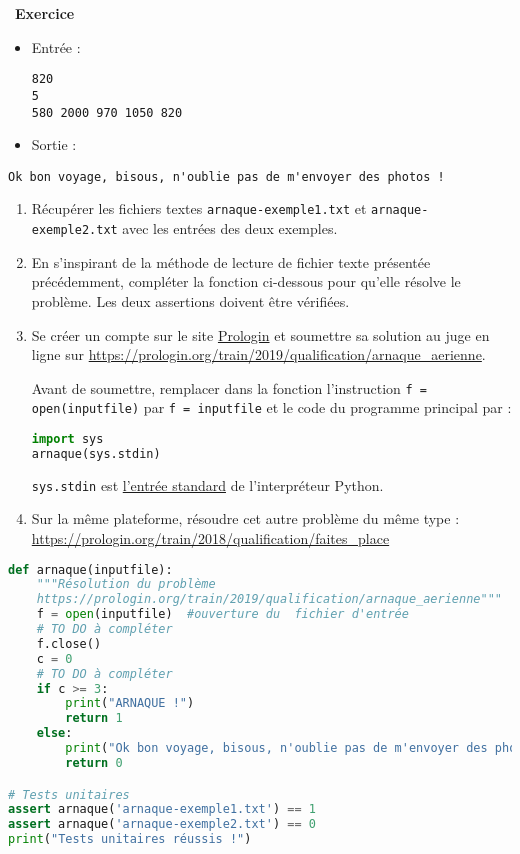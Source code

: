 \documentclass[
  11pt,
]{article}
\newcommand{\passthrough}[1]{#1}
\newcounter{exo}
\newenvironment{exercice}[1]
{\par \medskip   \addtocounter{exo}{1} \noindent  
\begin{bclogo}[arrondi =0.1,   noborder = true, logo=\bccrayon, marge=4]{~\textbf{Exercice} \textbf{\theexo} {\itshape #1} }  \par}
{
\end{bclogo}
 \par \bigskip }
\newcounter{def}
\newcounter{prog}
\newcounter{logi}
\begin{document}
\begin{exercice}{}
\begin{itemize}
  \begin{itemize}
  \item
    Entrée :

\begin{lstlisting}
820
5
580 2000 970 1050 820
\end{lstlisting}
  \item
    Sortie :
  \end{itemize}

\begin{lstlisting}
Ok bon voyage, bisous, n'oublie pas de m'envoyer des photos !
\end{lstlisting}
\end{itemize}

\begin{enumerate}
\def\labelenumi{\arabic{enumi}.}
\item
  Récupérer les fichiers textes
  \passthrough{\lstinline!arnaque-exemple1.txt!} et
  \passthrough{\lstinline!arnaque-exemple2.txt!} avec les entrées des
  deux exemples.
\item
  En s'inspirant de la méthode de lecture de fichier texte présentée
  précédemment, compléter la fonction ci-dessous pour qu'elle résolve le
  problème. Les deux assertions doivent être vérifiées.
\item
  Se créer un compte sur le site
  \href{https://prologin.org/user/register?next=\%2F}{Prologin} et
  soumettre sa solution au juge en ligne sur
  \url{https://prologin.org/train/2019/qualification/arnaque_aerienne}.

  Avant de soumettre, remplacer dans la fonction l'instruction
  \passthrough{\lstinline!f = open(inputfile)!} par
  \passthrough{\lstinline!f = inputfile!} et le code du programme
  principal par :

\begin{lstlisting}[language=Python]
import sys
arnaque(sys.stdin)
\end{lstlisting}

  \passthrough{\lstinline!sys.stdin!} est
  \href{https://docs.python.org/fr/3/library/sys.html\#sys.stdin}{l'entrée
  standard} de l'interpréteur Python.
\item
  Sur la même plateforme, résoudre cet autre problème du même type :
  \url{https://prologin.org/train/2018/qualification/faites_place}
\end{enumerate}

\begin{lstlisting}[language=Python]
def arnaque(inputfile):
    """Résolution du problème 
    https://prologin.org/train/2019/qualification/arnaque_aerienne"""
    f = open(inputfile)  #ouverture du  fichier d'entrée
    # TO DO à compléter
    f.close() 
    c = 0
    # TO DO à compléter
    if c >= 3:
        print("ARNAQUE !")
        return 1
    else:
        print("Ok bon voyage, bisous, n'oublie pas de m'envoyer des photos !")
        return 0

# Tests unitaires        
assert arnaque('arnaque-exemple1.txt') == 1
assert arnaque('arnaque-exemple2.txt') == 0
print("Tests unitaires réussis !")
\end{lstlisting}

\end{exercice}
\end{document}
